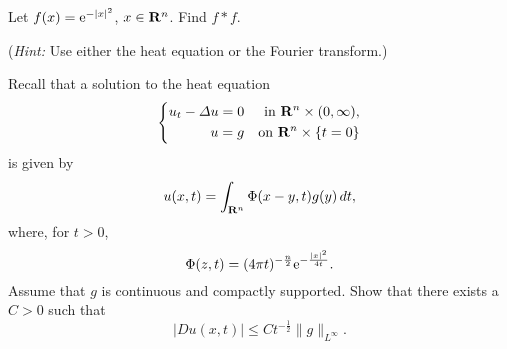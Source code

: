 \begin{problem}
  Let \(f(x)=\mathrm{e}^{-|x|^2}\), \(x\in\mathbf{R}^n\). Find \(f*f\).

  \noindent (\emph{Hint:} Use either the heat equation or the Fourier
  transform.)
\end{problem}
\begin{solution*}
\end{solution*}

\begin{problem}
  Recall that a solution to the heat equation
  \[
    \left\{
      \begin{aligned}
        u_t-\Lap u=0&&\text{in \(\R^n\times(0,\infty)\),}\\
        u=g&&\text{on \(\R^n\times\{t=0\}\)}
      \end{aligned}
    \right.
  \]
  is given by
  \[
    u(x,t)=\int_{\R^n}\Phi(x-y,t)g(y)\diff t,
  \]
  where, for \(t>0\),
  \[
    \Phi(z,t)=(4\pi t)^{-\frac{n}{2}}\rme^{-\frac{|x|^2}{4t}}.
  \]
  Assume that \(g\) is continuous and compactly supported. Show that there
  exists a \(C>0\) such that
  \[
    |D u(x,t)|\leq Ct^{-\frac{1}{2}}\|g\|_{L^\infty}.
  \]
\end{problem}
\begin{solution*}
\end{solution*}

